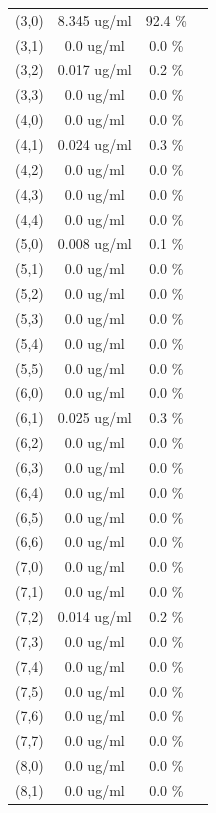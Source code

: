 \documentclass{article}
\begin{document}
\begin{tabular}{c c c c}
(3,0)&        8.345 ug/ml        &92.4 \%\\
(3,1)&        0.0 ug/ml        &0.0 \%\\
(3,2)&        0.017 ug/ml        &0.2 \%\\
(3,3)&        0.0 ug/ml        &0.0 \%\\
(4,0)&        0.0 ug/ml        &0.0 \%\\
(4,1)&        0.024 ug/ml        &0.3 \%\\
(4,2)&        0.0 ug/ml        &0.0 \%\\
(4,3)&        0.0 ug/ml        &0.0 \%\\
(4,4)&        0.0 ug/ml        &0.0 \%\\
(5,0)&        0.008 ug/ml        &0.1 \%\\
(5,1)&        0.0 ug/ml        &0.0 \%\\
(5,2)&        0.0 ug/ml        &0.0 \%\\
(5,3)&        0.0 ug/ml        &0.0 \%\\
(5,4)&        0.0 ug/ml        &0.0 \%\\
(5,5)&        0.0 ug/ml        &0.0 \%\\
(6,0)&        0.0 ug/ml        &0.0 \%\\
(6,1)&        0.025 ug/ml        &0.3 \%\\
(6,2)&        0.0 ug/ml        &0.0 \%\\
(6,3)&        0.0 ug/ml        &0.0 \%\\
(6,4)&        0.0 ug/ml        &0.0 \%\\
(6,5)&        0.0 ug/ml        &0.0 \%\\
(6,6)&        0.0 ug/ml        &0.0 \%\\
(7,0)&        0.0 ug/ml        &0.0 \%\\
(7,1)&        0.0 ug/ml        &0.0 \%\\
(7,2)&        0.014 ug/ml        &0.2 \%\\
(7,3)&        0.0 ug/ml        &0.0 \%\\
(7,4)&        0.0 ug/ml        &0.0 \%\\
(7,5)&        0.0 ug/ml        &0.0 \%\\
(7,6)&        0.0 ug/ml        &0.0 \%\\
(7,7)&        0.0 ug/ml        &0.0 \%\\
(8,0)&        0.0 ug/ml        &0.0 \%\\
(8,1)&        0.0 ug/ml        &0.0 \%\\

\end{tabular}
\end{document}
